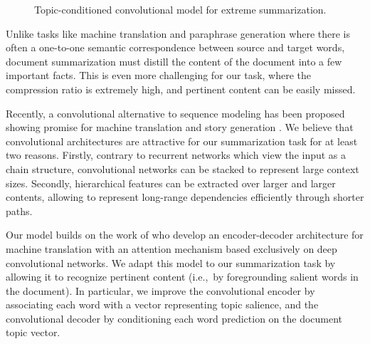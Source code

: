 \documentclass[11pt,a4paper]{article}
\begin{document}
\begin{figure}[t!]
{
  }
  \vspace{-0.5cm}
  \caption{Topic-conditioned convolutional model for extreme
    summarization.}\label{fig:architecture}
\end{figure}

Unlike tasks like machine translation and paraphrase generation where
there is often a one-to-one semantic correspondence between source and
target words, document summarization must distill the content of the
document into a few important facts. This is even more challenging for
our task, where the compression ratio is extremely high, and pertinent
content can be easily missed.




Recently, a convolutional alternative to sequence modeling has been
proposed showing promise for machine translation
\cite{convenc_mt,convseq2seq} and story generation
\cite{fan-hier-gen}. We believe that convolutional architectures are
attractive for our summarization task for at least two
reasons. Firstly, contrary to recurrent networks which view the input
as a chain structure, convolutional networks can be stacked to
represent large context sizes. Secondly, hierarchical features can be
extracted over larger and larger contents, allowing to represent
long-range dependencies efficiently through shorter paths.

Our model builds on the work of  who develop an
encoder-decoder architecture for machine translation with an attention
mechanism \cite{NIPS2015_5846} based exclusively on deep convolutional
networks. We adapt this model to our summarization task by allowing it
to recognize pertinent content (i.e.,~by foregrounding salient words
in the document).  In particular, we improve the convolutional encoder
by associating each word with a vector representing topic salience,
and the convolutional decoder by conditioning each word prediction on
the document topic vector.
\end{document}
